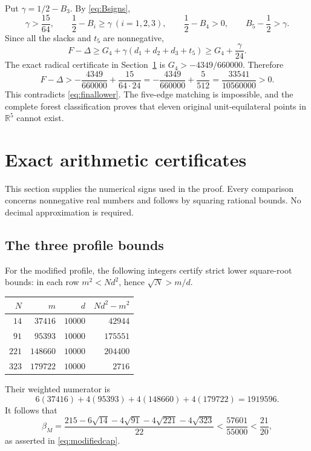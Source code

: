 \documentclass[11pt]{article}
\theoremstyle{definition}
\theoremstyle{remark}
\newcommand{\R}{\mathbb R}
\begin{document}
Put $\gamma=1/2-B_3$. By \eqref{eq:Bsigns},
\[
 \gamma>\frac{15}{64},\qquad
 \frac12-B_i\geq\gamma\ (i=1,2,3),\qquad
 \frac12-B_4>0,\qquad B_5-\frac12>\gamma.
\]
Since all the slacks and $t_5$ are nonnegative,
\begin{equation}\label{eq:gapfromslack}
 F-\Delta\geq G_4+\gamma(d_1+d_2+d_3+t_5)
       \geq G_4+\frac\gamma{24}.
\end{equation}
The exact radical certificate in Section~\ref{sec:arithmetic} is
$G_4>-4349/660000$. Therefore
\begin{equation}\label{eq:finalmargin}
 F-\Delta>
 -\frac{4349}{660000}+\frac{15}{64\cdot24}
 =-\frac{4349}{660000}+\frac5{512}
 =\frac{33541}{10560000}>0.
\end{equation}
This contradicts \eqref{eq:finallower}. The five-edge matching is
impossible, and the complete forest classification proves that eleven
original unit-equilateral points in $\R^5$ cannot exist.

\section{Exact arithmetic certificates}\label{sec:arithmetic}

This section supplies the numerical signs used in the proof. Every
comparison concerns nonnegative real numbers and follows by squaring
rational bounds. No decimal approximation is required.

\subsection{The three profile bounds}

For the modified profile, the following integers certify strict lower
square-root bounds: in each row $m^2<Nd^2$, hence $\sqrt N>m/d$.
\begin{center}
\begin{tabular}{rrrr}
\toprule
$N$ & $m$ & $d$ & $Nd^2-m^2$\\
\midrule
$14$ & $37416$ & $10000$ & $42944$\\
$91$ & $95393$ & $10000$ & $175551$\\
$221$ & $148660$ & $10000$ & $204400$\\
$323$ & $179722$ & $10000$ & $2716$\\
\bottomrule
\end{tabular}
\end{center}
Their weighted numerator is
\[
 6(37416)+4(95393)+4(148660)+4(179722)=1919596.
\]
It follows that
\[
 \beta_M=\frac{215-6\sqrt{14}-4\sqrt{91}-4\sqrt{221}-4\sqrt{323}}{22}
  <\frac{57601}{55000}<\frac{21}{20},
\]
as asserted in \eqref{eq:modifiedcap}.
\end{document}
